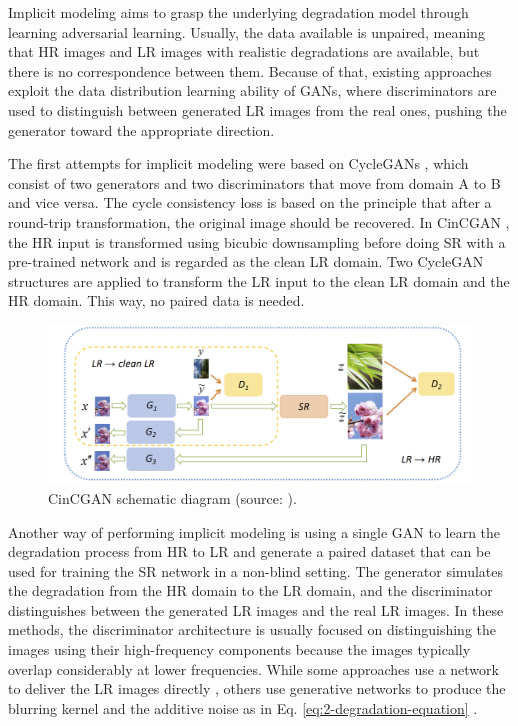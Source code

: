         Implicit modeling aims to grasp the underlying degradation model through learning adversarial learning.
        Usually, the data available is unpaired, meaning that HR images and LR images with realistic degradations are available, but there is no correspondence between them. Because of that, existing approaches exploit the data distribution learning ability of GANs, where discriminators are used to distinguish between generated LR images from the real ones, pushing the generator toward the appropriate direction.
        
        The first attempts for implicit modeling were based on CycleGANs \cite{CycleGAN2017}, which consist of two generators and two discriminators that move from domain A to B and vice versa. 
        The cycle consistency loss is based on the principle that after a round-trip transformation, the original image should be recovered.
        In CinCGAN \cite{yuan2018unsupervised}, the HR input is transformed using bicubic downsampling before doing SR with a pre-trained network and is regarded as the clean LR domain.
        Two CycleGAN structures are applied to transform the LR input to the clean LR domain and the HR domain. 
        This way, no paired data is needed.

        \begin{figure}[H]
            \centering
            \includegraphics[width=\textwidth]{Includes/4-ccingan.png}
            \caption{CinCGAN schematic diagram (source: \cite{yuan2018unsupervised}).}    
            \label{fig:2-CinCGAN}
        \end{figure}

        Another way of performing implicit modeling is using a single GAN to learn the degradation process from HR to LR and generate a  paired dataset that can be used for training the SR network in a non-blind setting. The generator simulates the degradation from the HR domain to the LR domain, and the discriminator distinguishes between the generated LR images and the real LR images.
        In these methods, the discriminator architecture is usually focused on distinguishing the images using their high-frequency components because the images typically overlap considerably at lower frequencies. While some approaches use a network to deliver the LR images directly \cite{bulat2018learn}, others use generative networks to produce the blurring kernel and the additive noise as in Eq. \ref{eq:2-degradation-equation} \cite{luo2022learning}.
        
